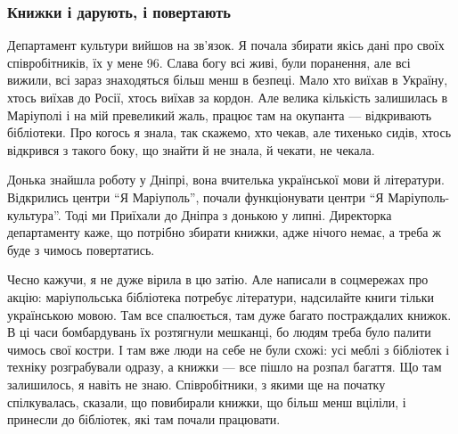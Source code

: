  
 
 
 
 

\subsubsection{Книжки і дарують, і повертають}

Департамент культури вийшов на зв'язок. Я почала збирати якісь дані про своїх
співробітників, їх у мене 96. Слава богу всі живі, були поранення, але всі
вижили, всі зараз знаходяться більш менш в безпеці. Мало хто виїхав в Україну,
хтось виїхав до Росії, хтось виїхав за кордон. Але велика кількість залишилась
в Маріуполі і на мій превеликий жаль, працює там на окупанта — відкривають
бібліотеки. Про когось я знала, так скажемо, хто чекав, але тихенько сидів,
хтось відкрився з такого боку, що знайти й не знала, й чекати, не чекала.


Донька знайшла роботу у Дніпрі, вона вчителька української мови й літератури.
Відкрились центри \enquote{Я Маріуполь}, почали функціонувати центри \enquote{Я Маріуполь-
культура}. Тоді ми Приїхали до Дніпра з донькою у липні. Директорка
департаменту каже, що потрібно збирати книжки, адже нічого немає, а треба ж
буде з чимось повертатись.

Чесно кажучи, я не дуже вірила в цю затію. Але написали в соцмережах про акцію:
маріупольська бібліотека потребує літератури, надсилайте книги тільки
українською мовою. Там все спалюється, там дуже багато постраждалих книжок. В
ці часи бомбардувань їх розтягнули мешканці, бо людям треба було палити чимось
свої костри. І там вже люди на себе не були схожі: усі меблі з бібліотек і
техніку розграбували одразу, а книжки — все пішло на розпал багаття. Що там
залишилось, я навіть не знаю. Співробітники, з якими ще на початку
спілкувалась, сказали, що повибирали книжки, що більш менш вціліли, і принесли
до бібліотек, які там почали працювати.


